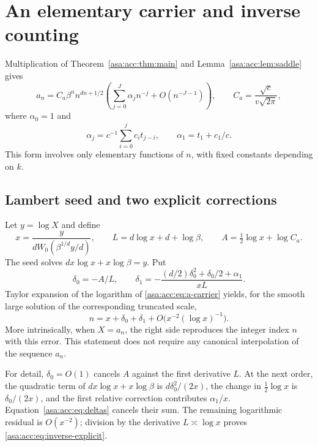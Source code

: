 \documentclass[11pt,letterpaper]{article}
\theoremstyle{remark}\newtheorem{remark}[theorem]{Remark}
\numberwithin{equation}{section}
\begin{document}
\section{An elementary carrier and inverse counting}\label{asa:acc:sec:inverse}
Multiplication of Theorem~\ref{asa:acc:thm:main} and Lemma~\ref{asa:acc:lem:saddle} gives
\begin{equation}\label{asa:acc:eq:a-carrier}
a_n=C_a\beta^n n^{dn+1/2}\left(\sum_{j=0}^{J}\alpha_jn^{-j}
+O(n^{-J-1})\right),\qquad C_a=\frac{\sqrt c}{v\sqrt{2\pi}},
\end{equation}
where $\alpha_0=1$ and
\begin{equation}\label{asa:acc:eq:alpha}
\alpha_j=c^{-1}\sum_{i=0}^{j}c_it_{j-i},\qquad
\alpha_1=t_1+c_1/c.
\end{equation}
This form involves only elementary functions of $n$, with fixed constants depending on $k$.

\subsection{Lambert seed and two explicit corrections}
Let $y=\log X$ and define
\begin{equation}\label{asa:acc:eq:Lambert}
x=\frac{y}{dW_0(\beta^{1/d}y/d)},\qquad
L=d\log x+d+\log\beta,\qquad A=\tfrac12\log x+\log C_a.
\end{equation}
The seed solves $dx\log x+x\log\beta=y$. Put
\begin{equation}\label{asa:acc:eq:deltas}
\delta_0=-A/L,\qquad
\delta_1=-\frac{(d/2)\delta_0^2+\delta_0/2+\alpha_1}{xL}.
\end{equation}
Taylor expansion of the logarithm of \eqref{asa:acc:eq:a-carrier} yields, for the smooth large solution of the corresponding truncated scale,
\begin{equation}\label{asa:acc:eq:inverse-explicit}
n=x+\delta_0+\delta_1+O\bigl(x^{-2}(\log x)^{-1}\bigr).
\end{equation}
More intrinsically, when $X=a_n$, the right side reproduces the integer index $n$ with this error. This statement does not require any canonical interpolation of the sequence $a_n$.

For detail, $\delta_0=O(1)$ cancels $A$ against the first derivative $L$. At the next order, the quadratic term of $dx\log x+x\log\beta$ is $d\delta_0^2/(2x)$, the change in $\frac12\log x$ is $\delta_0/(2x)$, and the first relative correction contributes $\alpha_1/x$. Equation~\eqref{asa:acc:eq:deltas} cancels their sum. The remaining logarithmic residual is $O(x^{-2})$; division by the derivative $L\asymp\log x$ proves \eqref{asa:acc:eq:inverse-explicit}.
\end{document}
